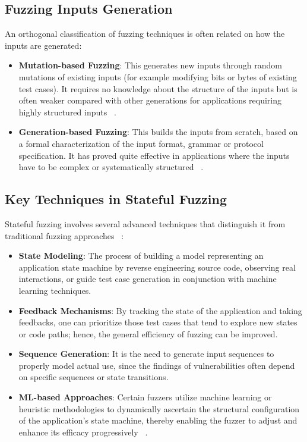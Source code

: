 \subsection{Fuzzing Inputs Generation}
An orthogonal classification of fuzzing techniques is often related on how the inputs are generated:
\begin{itemize}
    \item \textbf{Mutation-based Fuzzing}: This generates new inputs through random mutations of existing inputs (for example modifying bits or bytes of existing test cases). It requires no knowledge about the structure of the inputs but is often weaker compared with other generations for applications requiring highly structured inputs ~\cite{mutationgenerationbased}. 
    
    \item \textbf{Generation-based Fuzzing}: This builds the inputs from scratch, based on a formal characterization of the input format, grammar or protocol specification. It has proved quite effective in applications where the inputs have to be complex or systematically structured ~\cite{mutationgenerationbased}.
\end{itemize}

\subsection{Key Techniques in Stateful Fuzzing}
Stateful fuzzing involves several advanced techniques that distinguish it from traditional fuzzing approaches ~\cite{statefulfuzzingcristian}:

\begin{itemize}
    \item \textbf{State Modeling}: The process of building a model representing an application state machine by reverse engineering source code, observing real interactions, or guide test case generation in conjunction with machine learning techniques.
    
    \item \textbf{Feedback Mechanisms}: By tracking the state of the application and taking feedbacks, one can prioritize those test cases that tend to explore new states or code paths; hence, the general efficiency of fuzzing can be improved.
    
    \item \textbf{Sequence Generation}: It is the need to generate input sequences to properly model actual use, since the findings of vulnerabilities often depend on specific sequences or state transitions.
    
    \item \textbf{ML-based Approaches}: Certain fuzzers utilize machine learning or heuristic methodologies to dynamically ascertain the structural configuration of the application's state machine, thereby enabling the fuzzer to adjust and enhance its efficacy progressively ~\cite{learningbasedfuzzing,learningbasedfuzzing2}.
\end{itemize}

